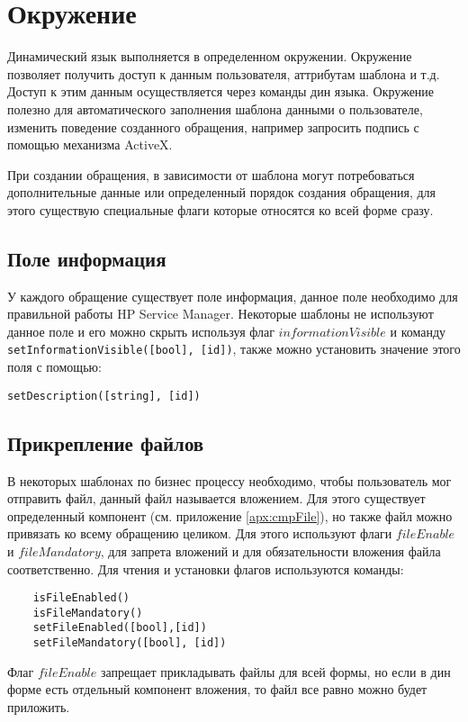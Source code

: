 \documentclass[../index.tex]{subfiles}
\begin{document}
\section{Окружение}  %

Динамический язык выполняется в определенном окружении. Окружение позволяет получить доступ к данным пользователя,
аттрибутам шаблона и т.д. Доступ к этим данным осуществляется через команды дин языка. 
Окружение полезно для автоматического заполнения шаблона данными о пользователе, изменить поведение созданного обращения,
например запросить подпись с помощью механизма ActiveX.

При создании обращения, в зависимости от шаблона могут потребоваться дополнительные данные или определенный порядок 
создания обращения, для этого существую специальные флаги которые относятся ко всей форме сразу.

\subsection{Поле информация}
У каждого обращение существует поле информация, данное поле необходимо для правильной работы HP Service Manager.
Некоторые шаблоны не используют данное поле и его можно скрыть используя флаг $informationVisible$ и команду
\verb|setInformationVisible([bool], [id])|, также можно установить значение этого поля с помощью:
\begin{verbatim}
setDescription([string], [id])
\end{verbatim}

\subsection{Прикрепление файлов}
В некоторых шаблонах по бизнес процессу необходимо, чтобы пользователь мог отправить файл, данный файл называется вложением.
Для этого существует определенный компонент (см. приложение \ref{apx:cmpFile}), но также файл можно привязать ко всему обращению целиком.
Для этого используют флаги $fileEnable$ и $fileMandatory$, для запрета вложений и для обязательности вложения файла соответственно.
Для чтения и установки флагов используются команды:
\begin{verbatim}
    isFileEnabled()
    isFileMandatory()
    setFileEnabled([bool],[id])
    setFileMandatory([bool], [id])
\end{verbatim}

Флаг $fileEnable$ запрещает прикладывать файлы для всей формы, но если в дин форме есть отдельный компонент вложения, то
файл все равно можно будет приложить.
\end{document}
